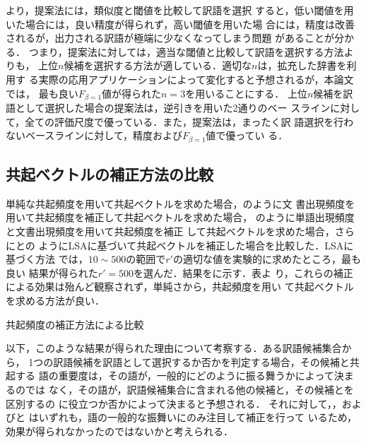 \documentclass[japanese]{jnlp_1.4}
\newcommand{\tabref}[1]{}
\newcommand{\figref}[1]{}
\newcommand{\eqnref}[1]{}
\begin{document}
\figref{fig:閾値の比較}より，提案法には，類似度と閾値を比較して訳語を選択
すると，低い閾値を用いた場合には，良い精度が得られず，高い閾値を用いた場
合には，精度は改善されるが，出力される訳語が極端に少なくなってしまう問題
があることが分かる．
つまり，提案法に対しては，適当な閾値と比較して訳語を選択する方法よりも，
上位$n$候補を選択する方法が適している．適切な$n$は，拡充した辞書を利用す
る実際の応用アプリケーションによって変化すると予想されるが，本論文では，
最も良い$F_{\beta=1}$値が得られた$n=3$を用いることにする．
上位$n$候補を訳語として選択した場合の提案法は，逆引きを用いた2通りのベー
スラインに対して，全ての評価尺度で優っている．また，提案法は，まったく訳
語選択を行わないベースラインに対して，精度および$F_{\beta=1}$値で優ってい
る．





\subsection{共起ベクトルの補正方法の比較}
\label{subsec:補正の比較}

単純な共起頻度を用いて共起ベクトルを求めた場合，\eqnref{eq:IDF}のように文
書出現頻度を用いて共起頻度を補正して共起ベクトルを求めた場合，
\eqnref{eq:TFIDF}のように単語出現頻度と文書出現頻度を用いて共起頻度を補正
して共起ベクトルを求めた場合，さらに\eqnref{eq:LSA1}と\eqnref{eq:LSA2}の
ようにLSAに基づいて共起ベクトルを補正した場合を比較した．LSAに基づく方法
では，$10\sim 500$の範囲で$r'$の適切な値を実験的に求めたところ，最も良い
結果が得られた$r'=500$を選んだ．結果を\tabref{tbl:補正の比較}に示す．表よ
り，これらの補正による効果は殆んど観察されず，単純さから，共起頻度を用い
て共起ベクトルを求める方法が良い．

\begin{table}[b]
  \caption{共起頻度の補正方法による比較}
  \label{tbl:補正の比較}
  \begin{center}

  \end{center}
\end{table}

以下，このような結果が得られた理由について考察する．ある訳語候補集合から，
1つの訳語候補を訳語として選択するか否かを判定する場合，その候補と共起する
語の重要度は，その語が，一般的にどのように振る舞うかによって決まるのでは
なく，その語が，訳語候補集合に含まれる他の候補と，その候補とを区別するの
に役立つか否かによって決まると予想される．
それに対して，\eqnref{eq:IDF}，\eqnref{eq:TFIDF}および\eqnref{eq:LSA1}と
\eqnref{eq:LSA2}はいずれも，語の一般的な振舞いにのみ注目して補正を行って
いるため，効果が得られなかったのではないかと考えられる．
\end{document}

